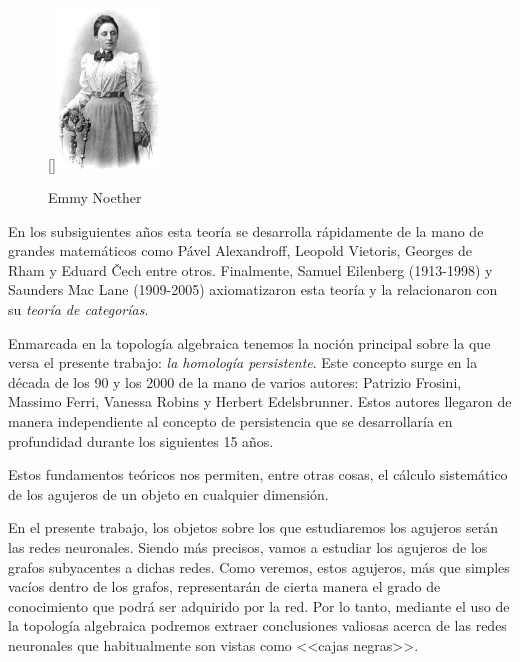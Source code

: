 \documentclass[12pt, a4paper, twoside]{book}
\numberwithin{equation}{section}
\theoremstyle{definition}
\theoremstyle{remark}
\theoremstyle{plain}
\begin{document}
	\begin{figure}
	  \begin{center}
		  \raisebox{16pt}[\dimexpr{}\baselineskip\relax]{\includegraphics[width=0.25\textwidth]{Images/315px-Noether.jpg}}
	  \vspace*{-9mm}
	  \caption*{Emmy Noether}
	  \end{center}
	\end{figure}

	En los subsiguientes años esta teoría se desarrolla rápidamente de la 
	mano de grandes matemáticos como Pável Alexandroff, Leopold Vietoris, 
	Georges de Rham y Eduard \v{C}ech entre otros. Finalmente, Samuel 
	Eilenberg (1913-1998) y 
	Saunders Mac Lane (1909-2005) axiomatizaron esta teoría y la 
	relacionaron con su \emph{teoría de categorías}.

	Enmarcada en la topología algebraica tenemos la noción principal 
	sobre la que versa el presente trabajo: \emph{la homología 
	persistente}. Este concepto surge en la década de los 90 y los 2000 
	de la mano de varios autores: Patrizio Frosini, Massimo Ferri, 
	Vanessa Robins y Herbert Edelsbrunner. Estos autores llegaron de 
	manera independiente al concepto de persistencia que se desarrollaría 
	en profundidad durante los siguientes 15 años. 

	Estos fundamentos teóricos nos permiten, entre otras cosas, el 
	cálculo sistemático de los agujeros de un objeto en cualquier 
	dimensión. 

	En el presente trabajo, los objetos sobre los que estudiaremos los
	agujeros serán las redes neuronales. Siendo más precisos, vamos a 
	estudiar los agujeros de los grafos subyacentes a dichas redes.
	Como veremos, estos agujeros, más que simples 
	vacíos dentro de los grafos, representarán de cierta manera el grado 
	de conocimiento que podrá ser adquirido por la red. Por lo tanto, 
	mediante el uso de 
	la topología algebraica podremos extraer conclusiones valiosas acerca 
	de las redes neuronales que habitualmente son vistas como <<cajas 
	negras>>.
\end{document}
